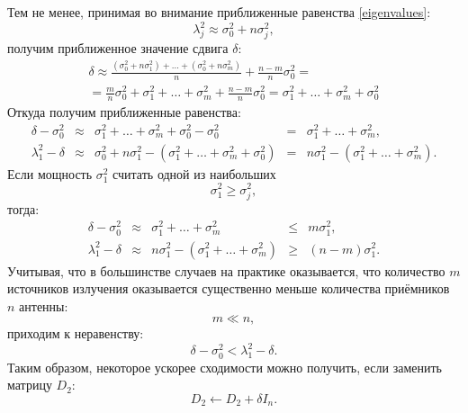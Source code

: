 \documentclass[a4paper,12pt]{article}
\begin{document}
    Тем не менее, принимая во внимание приближенные равенства \eqref{eigenvalues}:
    \[
        \lambda_j^2 \approx \sigma_0^2 + n \sigma_j^2 ,
    \]
    получим приближенное значение сдвига $\delta$:
    \begin{multline*}
        \delta
        \approx \frac{(\sigma_0^2 + n \sigma_1^2) + \dots + (\sigma_0^2 + n \sigma_m^2)}{n} + \frac{n-m}{n} \sigma_0^2 = \\
        = \frac{m}{n} \sigma_0^2 + \sigma_1^2 + \dots + \sigma_m^2 + \frac{n-m}{n} \sigma_0^2
        = \sigma_1^2 + \dots + \sigma_m^2 + \sigma_0^2
    \end{multline*}
    Откуда получим приближенные равенства:
    \[
        \begin{array}{lclcl}
            \delta - \sigma_0^2  & \approx & \sigma_1^2 + \dots + \sigma_m^2 + \sigma_0^2 - \sigma_0^2 & = & \sigma_1^2 + \dots + \sigma_m^2 , \\
            \lambda_1^2 - \delta & \approx & \sigma_0^2 + n \sigma_1^2 - ( \sigma_1^2 + \dots + \sigma_m^2 + \sigma_0^2 ) & = & n \sigma_1^2 - ( \sigma_1^2 + \dots + \sigma_m^2 ) .
        \end{array}
    \]
    Если мощность $\sigma_1^2$ считать одной из наибольших
    \[
        \sigma_1^2 \ge \sigma_j^2,
    \]
    тогда:
    \[
        \begin{array}{lclcl}
            \delta - \sigma_0^2  & \approx & \sigma_1^2 + \dots + \sigma_m^2 & \le & m \sigma_1^2, \\
            \lambda_1^2 - \delta & \approx & n \sigma_1^2 - ( \sigma_1^2 + \dots + \sigma_m^2 ) & \ge & (n - m) \sigma_1^2.
        \end{array}
    \]
    Учитывая, что в большинстве случаев на практике оказывается, что количество $m$ источников излучения оказывается существенно меньше количества приёмников $n$ антенны:
    \[
        m \ll n ,
    \]
    приходим к неравенству:
    \[
        \delta - \sigma_0^2 < \lambda_1^2 - \delta .
    \]
    Таким образом, некоторое ускорее сходимости можно получить, если заменить матрицу $D_2$:
    \[
        D_2 \leftarrow D_2 + \delta I_n.
    \]
\end{document}
